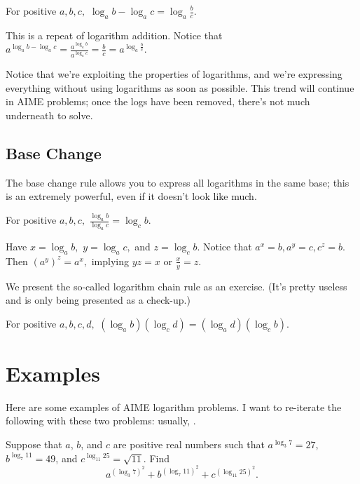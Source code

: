 \begin{theo}
For positive $a,b,c,$ $\log_{a}b-\log_{a}c=\log_{a}{\frac{b}{c}}.$
\end{theo}

\begin{pro}
This is a repeat of logarithm addition. Notice that $a^{\log_ab-\log_ac}=\frac{a^{\log_ab}}{ a^{\log_ac}}=\frac{b}{c}=a^{\log_a\frac{b}{c}}.$
\end{pro}

Notice that we're exploiting the properties of logarithms, and we're expressing everything without using logarithms as soon as possible. This trend will continue in AIME problems; once the logs have been removed, there's not much underneath to solve.

\subsection{Base Change}
The base change rule allows you to express all logarithms in the same base; this is an extremely powerful, even if it doesn't look like much.

\begin{theo}
For positive $a,b,c,$ $\frac{\log_{a}b}{\log_{a}c}=\log_{c}b.$
\end{theo}

\begin{pro}
Have $x=\log_ab,$ $y=\log_ac,$ and $z=\log_cb.$ Notice that $a^x=b,a^y=c,c^z=b.$ Then $(a^y)^z=a^x,$ implying $yz=x$ or $\frac{x}{y}=z.$
\end{pro}

We present the so-called logarithm chain rule as an exercise. (It's pretty useless and is only being presented as a check-up.)

\begin{exer}
For positive $a,b,c,d,$ $(\log_{a}b)(\log_{c}d)=(\log_{a}d)(\log_{c}b).$
\end{exer}

\section{Examples}
Here are some examples of AIME logarithm problems. I want to re-iterate the following with these two problems: usually, .
   
\begin{exam}[AIME II 2009/2]
Suppose that $a$, $b$, and $c$ are positive real numbers such that $a^{\log_3 7} = 27$, $b^{\log_7 11} = 49$, and $c^{\log_{11}25} = \sqrt{11}$. Find
\[a^{(\log_3 7)^2} + b^{(\log_7 11)^2} + c^{(\log_{11} 25)^2}.\]
\end{exam}

